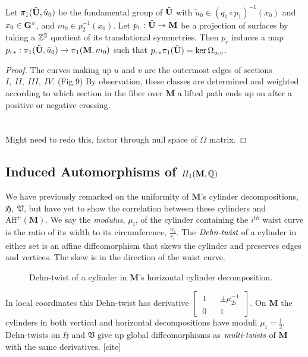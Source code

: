 \documentclass[a4paper, 11pt]{article}
\def\bM{\mathbf{M}}
\def\utild{\tilde{u}_0}
\begin{document}
\begin{thm}
Let $\pi_1(\btU,\utild)$ be the fundamental group of $\tilde{\mathbf{U}}$ with $\utild\in (q_1\circ p_1)^{-1}(x_0)$ and $x_0\in\mathbf{G}^\circ$, and $m_0\in p_2^{-1}(x_0)$. Let $p_r:\btU\twoheadrightarrow\bM$ be a projection of surfaces by taking a $\mathbb{Z}^2$ quotient of its translational symmetries. Then $p_r$ induces a map $p_{r*}:\pi_1(\btU,\utild)\rightarrow\pi_1(\bM,m_0)$ such that $p_{r*}\pi_1(\tilde{\mathbf{U}})=\ker\Omega_{u,v}$.
\begin{proof}
The curves making up $u$ and $v$ are the outermost edges of sections $I,~II,~III,~IV$. (Fig 9) By observation, these classes are determined and weighted according to which section in the fiber over $\bM$ a lifted path ends up on after a positive or negative crossing.\\\\\\
Might need to redo this, factor through null space of $\Omega$ matrix.
\end{proof}
\end{thm}

\subsection{Induced Automorphisms of $H_1(\bM,\QQ)$}
We have previously remarked on the uniformity of $\bM$'s cylinder decompositions, $\mathfrak{H},~\mathfrak{V}$, but have yet to show the correlation between these cylinders and $\text{Aff}^+(\bM)$. We say the \emph{modulus}, $\mu_i$, of the cylinder containing the $i^{th}$ waist curve is the ratio of its width to its circumference, $\frac{w_i}{c_i}$. The $\emph{Dehn-twist}$ of a cylinder in either set is an affine diffeomorphism that skews the cylinder and preserves edges and vertices. The skew is in the direction of the waist curve.

\begin{figure}[H]
\centering

\label{fig:skew}
\caption{Dehn-twist of a cylinder in $\bM$'s horizontal cylinder decomposition.}
\end{figure}

In local coordinates this Dehn-twist has derivative $\left[~\begin{matrix}1 && \pm\mu_{2i}^{-1}\\0 && 1\end{matrix}~\right]$. On $\bM$ the cylinders in both vertical and horizontal decompositions have moduli $\mu_i=\frac{1}{2}$. Dehn-twists on $\mathfrak{H}$ and $\mathfrak{V}$ give up global diffeomorphisms as $\emph{multi-twists}$ of $\bM$ with the same derivatives. [cite] 
\end{document}
